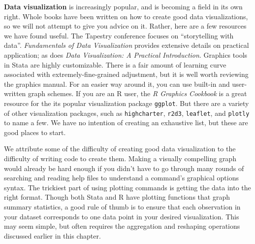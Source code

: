 \textbf{Data visualization}
is increasingly popular,
and is becoming a field in its own right.\cite{healy2018data,wilke2019fundamentals}
Whole books have been written on how to create good data visualizations,
so we will not attempt to give you advice on it.
Rather, here are a few resources we have found useful.
The Tapestry conference focuses on ``storytelling with data''.
\textit{Fundamentals of Data Visualization} provides extensive details on practical application;
as does \textit{Data Visualization: A Practical Introduction}.
Graphics tools in Stata are highly customizable.
There is a fair amount of learning curve associated with
extremely-fine-grained adjustment,
but it is well worth reviewing the graphics manual.
For an easier way around it,
you can use built-in and user-written graph schemes.
If you are an R user, the \textit{R Graphics Cookbook}
is a great resource for the its popular visualization package \texttt{ggplot}.
But there are a variety of other visualization packages,
such as \texttt{highcharter}, \texttt{r2d3}, \texttt{leaflet},
and \texttt{plotly} to name a few.
We have no intention of creating an exhaustive list,
but these are good places to start.

We attribute some of the difficulty of creating good data visualization
to the difficulty of writing code to create them.
Making a visually compelling graph would already be hard enough if
you didn't have to go through many rounds of searching and reading help files
to understand a command's graphical options syntax.
The trickiest part of using plotting commands is getting the data into the right format.
Though both Stata and R have plotting functions that graph summary statistics,
a good rule of thumb is to ensure that each
observation in your dataset corresponds to one data point in your desired visualization.
This may seem simple,
but often requires the aggregation and reshaping operations
discussed earlier in this chapter.

